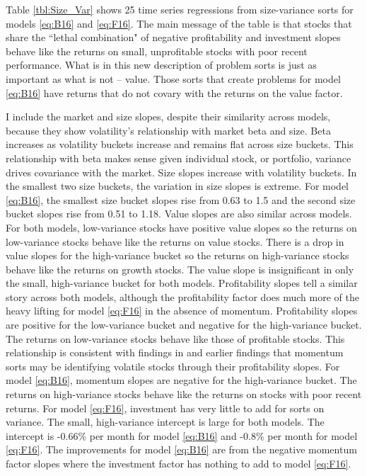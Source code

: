 
Table \ref{tbl:Size_Var} shows 25 time series regressions from
size-variance sorts for models \ref{eq:B16} and \ref{eq:F16}.
The main message of the table is that stocks that share the
``lethal combination" of negative profitability and investment slopes behave
like the returns on small, unprofitable stocks with poor recent performance.
What is in this new description of problem sorts is just as important as what
is not -- value.
Those sorts that create problems for model \ref{eq:B16} have returns that do
not covary with the returns on the value factor.

I include the market and size slopes, despite their similarity across models,
because they show volatility's relationship with market beta and size.
Beta increases as volatility buckets increase and remains flat across size
buckets.
This relationship with beta makes sense given individual stock, or portfolio,
variance drives covariance with the market.
Size slopes increase with volatility buckets.
In the smallest two size buckets, the variation in size slopes is extreme.
For model \ref{eq:B16}, the smallest size bucket slopes rise from 0.63 to 1.5
and the second size bucket slopes rise from 0.51 to 1.18.
Value slopes are also similar across models.
For both models, low-variance stocks have positive value slopes so
the returns on low-variance stocks behave like the returns on value stocks.
There is a drop in value slopes for the high-variance bucket so
the returns on high-variance stocks behave like the returns on growth stocks.
The value slope is insignificant in only the small, high-variance bucket for
both models.
Profitability slopes tell a similar story across both models,
although the profitability factor does much more of the heavy lifting for model
\ref{eq:F16} in the absence of momentum.
Profitability slopes are positive for the low-variance bucket and negative for
the high-variance bucket.
The returns on low-variance stocks behave like those of profitable stocks.
This relationship is consistent with findings in
\textcite{novy2014understanding} and earlier findings that momentum sorts
may be identifying volatile stocks through their profitability slopes.
For model \ref{eq:B16}, momentum slopes are negative for the high-variance
bucket.
The returns on high-variance stocks behave like the returns on stocks with poor
recent returns. 
For model \ref{eq:F16}, investment has very little to add for sorts on
variance.
The small, high-variance intercept is large for both models.
The intercept is -0.66\% per month for model \ref{eq:B16} and -0.8\% per month
for model \ref{eq:F16}.
The improvements for model \ref{eq:B16} are from the negative momentum factor
slopes where the investment factor has nothing to add to model \ref{eq:F16}.

